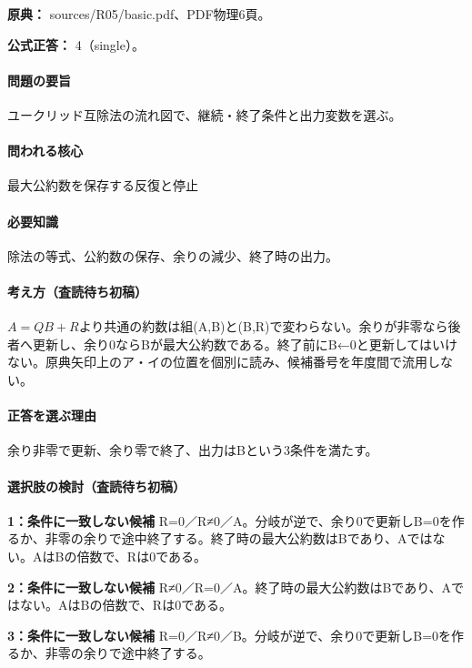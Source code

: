 \noindent\textbf{原典：} sources/R05/basic.pdf、PDF物理6頁。

\textbf{公式正答：} 4（single）。

\paragraph{問題の要旨} ユークリッド互除法の流れ図で、継続・終了条件と出力変数を選ぶ。

\paragraph{問われる核心} 最大公約数を保存する反復と停止

\paragraph{必要知識} 除法の等式、公約数の保存、余りの減少、終了時の出力。

\paragraph{考え方（査読待ち初稿）} \(A=QB+R\)より共通の約数は組(A,B)と(B,R)で変わらない。余りが非零なら後者へ更新し、余り0ならBが最大公約数である。終了前にB←0と更新してはいけない。原典矢印上のア・イの位置を個別に読み、候補番号を年度間で流用しない。

\paragraph{正答を選ぶ理由} 余り非零で更新、余り零で終了、出力はBという3条件を満たす。

\paragraph{選択肢の検討（査読待ち初稿）}\mbox{}\par

\noindent\textbf{1：条件に一致しない候補} R=\allowbreak{}0／R≠0／A。分岐が逆で、余り0で更新しB=\allowbreak{}0を作るか、非零の余りで途中終了する。終了時の最大公約数はBであり、Aではない。AはBの倍数で、Rは0である。\par

\noindent\textbf{2：条件に一致しない候補} R≠0／R=\allowbreak{}0／A。終了時の最大公約数はBであり、Aではない。AはBの倍数で、Rは0である。\par

\noindent\textbf{3：条件に一致しない候補} R=\allowbreak{}0／R≠0／B。分岐が逆で、余り0で更新しB=\allowbreak{}0を作るか、非零の余りで途中終了する。\par

